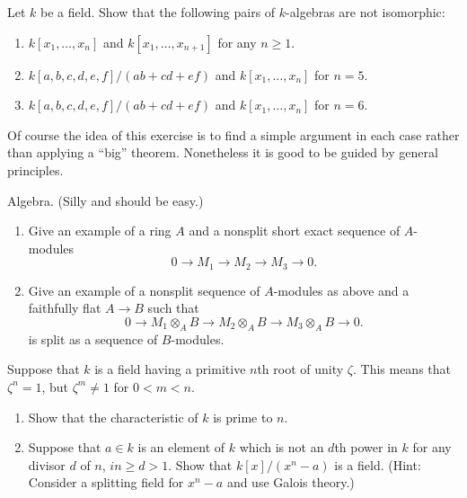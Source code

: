 \begin{exercise}
\label{exercise-not-isomorphic}
Let $k$ be a field. Show that the following pairs of
$k$-algebras are not isomorphic:
\begin{enumerate}
\item $k[x_1, \ldots, x_n]$ and $k[x_1, \ldots, x_{n + 1}]$ for any
$n\geq 1$.
\item $k[a, b, c, d, e, f]/(ab + cd + ef)$ and $k[x_1, \ldots, x_n]$
for $n = 5$.
\item $k[a, b, c, d, e, f]/(ab + cd + ef)$ and $k[x_1, \ldots, x_n]$
for $n = 6$.
\end{enumerate}
\end{exercise}

\begin{remark}
\label{remark-simple-geometric}
Of course the idea of this exercise is to find
a simple argument in each case rather than applying a ``big'' theorem.
Nonetheless it is good to be guided by general principles.
\end{remark}

\begin{exercise}
\label{exercise-silly}
Algebra. (Silly and should be easy.)
\begin{enumerate}
\item Give an example of a ring $A$ and a nonsplit
short exact sequence of $A$-modules
$$
0 \to M_1 \to M_2 \to M_3 \to 0.
$$
\item Give an example of a nonsplit sequence of $A$-modules
as above and a faithfully flat $A \to B$ such that
$$
0 \to M_1\otimes_AB \to M_2\otimes_AB \to M_3\otimes_AB \to 0.
$$
is split as a sequence of $B$-modules.
\end{enumerate}
\end{exercise}

\begin{exercise}
\label{exercise-field-kummer}
Suppose that $k$ is a field having a primitive $n$th root
of unity $\zeta$. This means that $\zeta^n = 1$, but $\zeta^m\not = 1$ for
$0<m<n$.
\begin{enumerate}
\item Show that the characteristic of $k$ is prime to $n$.
\item Suppose that $a \in k$ is an element of $k$ which is not
an $d$th power in $k$ for any divisor $d$ of $n$, $in\geq d>1$. Show that
$k[x]/(x^n-a)$ is a field. (Hint: Consider a splitting field for
$x^n-a$ and use Galois theory.)
\end{enumerate}
\end{exercise}

